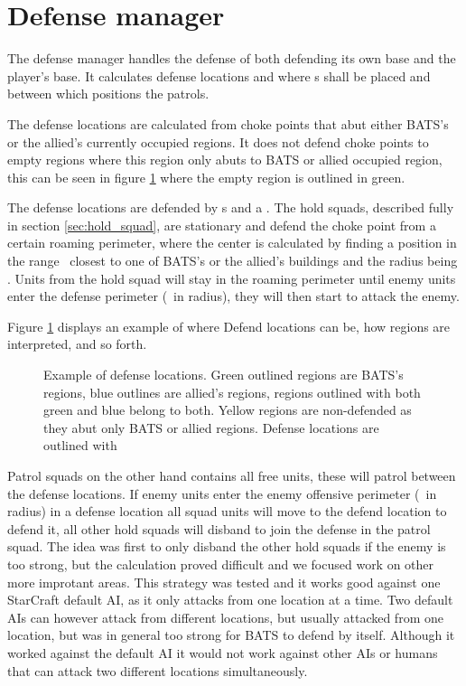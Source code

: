 \section{Defense manager}
\label{sec:defense_manager}
The defense manager handles the defense of both defending its own base and the player’s base. It calculates defense locations and where s shall be placed and between which positions the  patrols.

The defense locations are calculated from choke points that abut either BATS’s or the allied’s currently occupied regions. It does not defend choke points to empty regions where this region only abuts to BATS or allied occupied region, this can be seen in figure \ref{fig:defense_locations} where the empty region is outlined in green.

The defense locations are defended by s and a . The hold squads, described fully in section \ref{sec:hold_squad}, are stationary and defend the choke point from a certain roaming perimeter, where the center is calculated by finding a position in the range \squadDefendRoamDistanceMinMax~closest to one of BATS’s or the allied’s buildings and the radius being \squadDefendRoamPerimeter. Units from the hold squad will stay in the roaming perimeter until enemy units enter the defense perimeter (\squadDefendDefendPerimeter~in radius), they will then start to attack the enemy. 

Figure \ref{fig:defense_locations} displays an example of where Defend locations can be, how regions are interpreted, and so forth.

\begin{figure}[htb]
\centering
\caption{Example of defense locations. Green outlined regions are BATS’s regions, blue outlines are allied’s regions, regions outlined with both green and blue belong to both. Yellow regions are non-defended as they abut only BATS or allied regions. Defense locations are outlined with}
\label{fig:defense_locations}
\end{figure}

Patrol squads on the other hand contains all free units, these will patrol between the defense locations. If enemy units enter the enemy offensive perimeter (\squadDefendEnemyOffensivePerimeter~in radius) in a defense location all squad units will move to the defend location to defend it, all other hold squads will disband to join the defense in the patrol squad. The idea was first to only disband the other hold squads if the enemy is too strong, but the calculation proved difficult and we focused work on other more improtant areas. This strategy was tested and it works good against one StarCraft default AI, as it only attacks from one location at a time. Two default AIs can however attack from different locations, but usually attacked from one location, but was in general too strong for BATS to defend by itself. Although it worked against the default AI it would not work against other AIs or humans that can attack two different locations simultaneously.


